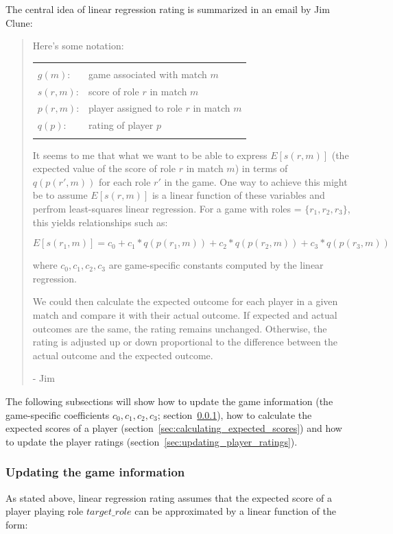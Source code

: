 \documentclass[a4paper,10pt]{article}
\begin{document}
The central idea of linear regression rating is summarized in an email by Jim Clune:
\begin{quotation}
Here's some notation:

\begin{tabular}{ll}
&\\
$g(m)$:    & game associated with match $m$ \\
$s(r, m)$: & score of role $r$ in match $m$ \\
$p(r, m)$: & player assigned to role $r$ in match $m$ \\
$q(p)$:    & rating of player $p$ \\
&
\end{tabular}

It seems to me that what we want to be able to express $E[s(r, m)]$ (the
expected value of the score of role $r$ in match $m$) in terms of $q(p(r', m))$
for each role $r'$ in the game. One way to achieve this might be to assume
$E[s(r, m)]$ is a linear function of these variables and perfrom least-squares
linear regression. For a game with roles = $\{r_1, r_2, r_3\}$, this yields
relationships such as:

\[E[s(r_1, m)] = c_0 + c_1*q(p(r_1, m)) + c_2*q(p(r_2, m)) + c_3*q(p(r_3, m))\]

where $c_0, c_1, c_2, c_3$ are game-specific constants computed by the linear
regression.

We could then calculate the expected outcome for each player in a
given match and compare it with their actual outcome. If expected and
actual outcomes are the same, the rating remains unchanged.
Otherwise, the rating is adjusted up or down proportional to the
difference between the actual outcome and the expected outcome.

- Jim
\end{quotation}

The following subsections will show how to update the game information (the game-specific coefficients $c_0, c_1, c_2, c_3$; section~\ref{sec:updating_game_information}), how to calculate the expected scores of a player (section~\ref{sec:calculating_expected_scores}) and how to update the player ratings (section~\ref{sec:updating_player_ratings}).

\subsubsection{Updating the game information}
\label{sec:updating_game_information}

As stated above, linear regression rating assumes that the expected score of a player playing role $target\_role$ can be approximated by a linear function of the  form:
\end{document}
